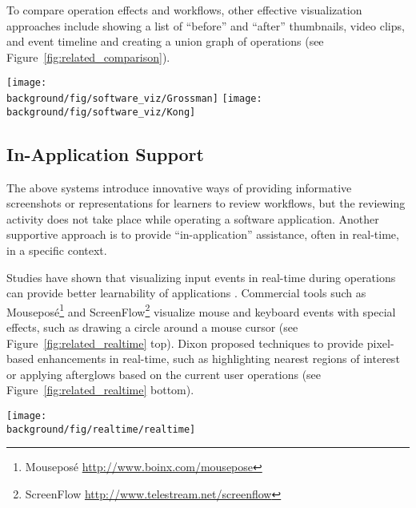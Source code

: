 To compare operation effects and workflows, other effective visualization approaches include showing a list of ``before'' and ``after'' thumbnails, video clips, and event timeline \cite{Grossman:2010jz} and creating a union graph of operations \cite{Kong:2012:DTR:2207676.2208549} (see Figure~\ref{fig:related_comparison}).

\begin{figure*}[t!]
  \centering
  \texttt{[image: \\background/fig/software\_viz/Grossman]}
  \texttt{[image: \\background/fig/software\_viz/Kong]}
  \caption{Instructional systems that help learners compare effects and similar tutorials using: (left) before and after images (a) and event timeline (b) by Grossman \ea{}~\cite{Grossman:2010jz} and (right) operation union graph by Kong \ea{}~\cite{Kong:2012:DTR:2207676.2208549}.}
  \label{fig:related_comparison}
\end{figure*}


\subsection{In-Application Support}

The above systems introduce innovative ways of providing informative screenshots or representations for learners to review workflows, but the reviewing activity does not take place while operating a software application.
%
Another supportive approach is to provide ``in-application'' assistance, often in real-time, in a specific context.

Studies have shown that visualizing input events in real-time during operations can provide better learnability of applications \cite{Dixon:2010fb}.
%
Commercial tools such as Mouseposé\footnote{Mouseposé \url{http://www.boinx.com/mousepose}} and ScreenFlow\footnote{ScreenFlow \url{http://www.telestream.net/screenflow}} visualize mouse and keyboard events with special effects, such as drawing a circle around a mouse cursor (see Figure~\ref{fig:related_realtime} top).
%
Dixon \ea{} proposed techniques to provide pixel-based enhancements in real-time, such as highlighting nearest regions of interest or applying afterglows based on the current user operations \cite{Dixon:2010fb,Dixon:2011:CHP:1978942.1979086} (see Figure~\ref{fig:related_realtime} bottom).

\begin{figure*}[t!]
  \centering
  \texttt{[image: \\background/fig/realtime/realtime]}
  \caption{Real-time visual enhancements on GUI applications: (top) Mouseposé highlights mouse cursors or text input; (bottom) Prefab creates target-aware or afterglow effects during user operating~\cite{Dixon:2010fb}.}
  \label{fig:related_realtime}
\end{figure*}

